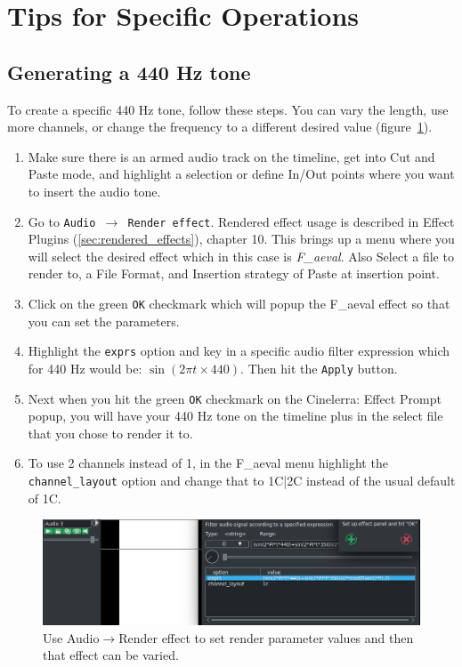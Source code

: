 \section{Tips for Specific Operations}%
\label{sec:tips_specific_operations}

\subsection{Generating a 440 Hz tone}%
\label{sub:generating_440_tone}

To create a specific 440 Hz tone, follow these steps.  You can vary the length, use more channels, or change the frequency to a different desired value (figure~\ref{fig:aeval}).

\begin{enumerate}
	\item Make sure there is an armed audio track on the timeline, get into Cut and Paste mode, and highlight
	a selection or define In/Out points where you want to insert the audio tone.
	\item Go to \texttt{Audio $\rightarrow$ Render effect}.  Rendered effect usage is described in Effect Plugins (\ref{sec:rendered_effects}), chapter 10. This brings up a menu where you will select the desired effect which in this case is \textit{F\_aeval}.  Also Select a file to render to, a File Format, and Insertion strategy of Paste at insertion point.
	\item Click on the green \texttt{OK} checkmark which will popup the F\_aeval effect so that you can set the
	parameters.
	\item Highlight the \texttt{exprs} option and key in a specific audio filter expression which for 440 Hz would be:
	$\sin(2\pi t\times440)$.  Then hit the \texttt{Apply} button.
	\item Next when you hit the green \texttt{OK} checkmark on the Cinelerra: Effect Prompt popup, you will have
	your 440 Hz tone on the timeline plus in the select file that you chose to render it to.
	\item To use 2 channels instead of 1, in the F\_aeval menu highlight the \texttt{channel\_layout} option and change
	that to 1C|2C instead of the usual default of 1C.
\end{enumerate}

\begin{figure}[htpb]
	\centering
	\includegraphics[width=1.0\linewidth]{images/aeval.png}
	\caption{Use Audio$\rightarrow$Render effect to set render parameter values and then that effect can be varied.}
	\label{fig:aeval}
\end{figure}

